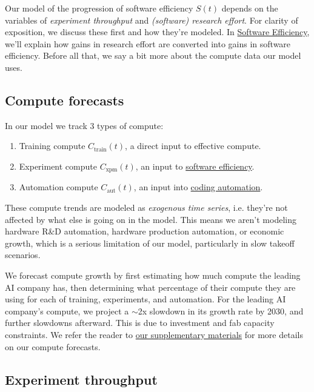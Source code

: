 \documentclass{article}
\theoremstyle{definition}
\begin{document}
Our model of the progression of software efficiency $S(t)$ depends on the variables of \textit{experiment throughput} and \textit{(software) research effort}. For clarity of exposition, we discuss these first and how they're modeled. In \hyperref[Software efficiency]{Software Efficiency}, we'll explain how gains in research effort are converted into gains in software efficiency. Before all that, we say a bit more about the compute data our model uses.

\subsection{Compute forecasts} \label{Compute}

In our model we track 3 types of compute:
\begin{enumerate}
    \item Training compute $C_\text{train}(t)$, a direct input to effective compute.
    \item Experiment compute $C_\text{xpm}(t)$, an input to \hyperref[Software efficiency]{software efficiency}.
    \item Automation compute $C_\text{aut}(t)$, an input into \hyperref[Coding automation]{coding automation}.
\end{enumerate}

These compute trends are modeled as \textit{exogenous time series}, i.e. they're not affected by what else is going on in the model. This means we aren't modeling hardware R\&D automation, hardware production automation, or economic growth, which is a serious limitation of our model, particularly in slow takeoff scenarios. 

We forecast compute growth by first estimating how much compute the leading AI company has, then determining what percentage of their compute they are using for each of training, experiments, and automation. For the leading AI company's compute, we project a $\sim$2x slowdown in its growth rate by 2030, and further slowdowns afterward. This is due to investment and fab capacity constraints. We refer the reader to \href{https://docs.google.com/document/d/1ru6Okbxb6XuH18Cz8439sdQJazMV39hNxsWDokh97r0/edit?tab=t.0#heading=h.6ml0ol8kxh0w}{our supplementary materials} for more details on our compute forecasts.

\subsection{Experiment throughput} \label{Experiment throughput}
\end{document}

